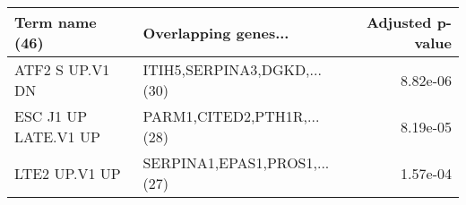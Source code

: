 \begin{tabular}{llr}
\toprule
      Term name (46) &         Overlapping genes... &  Adjusted p-value \\
\midrule
     ATF2 S UP.V1 DN &  ITIH5,SERPINA3,DGKD,...(30) &          8.82e-06 \\
ESC J1 UP LATE.V1 UP &   PARM1,CITED2,PTH1R,...(28) &          8.19e-05 \\
       LTE2 UP.V1 UP & SERPINA1,EPAS1,PROS1,...(27) &          1.57e-04 \\
\bottomrule
\end{tabular}
